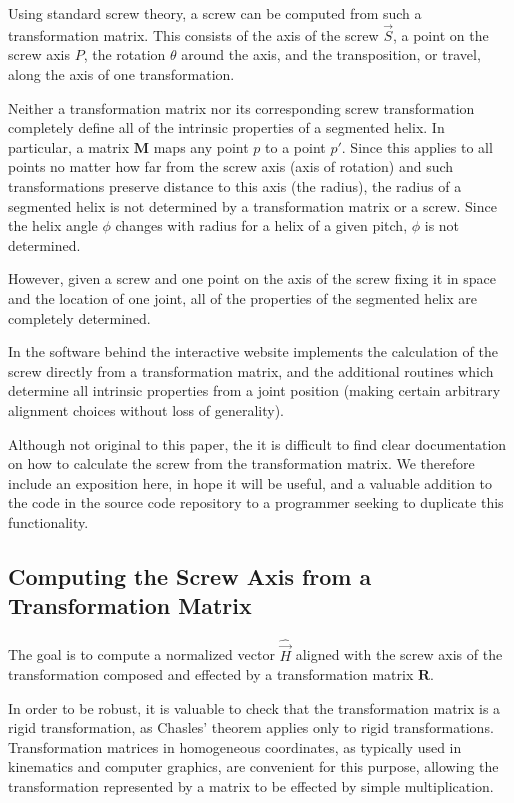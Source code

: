 \documentclass[11pt]{article}
\begin{document}
{Using standard screw theory\cite{wittenburg2016kinematics,wiki:screwaxis},
a screw can be computed from such
a transformation matrix. This consists of the axis of the screw $\overrightarrow{S}$,
a point on the screw axis $P$,
the rotation $\theta$ around the axis, and the
transposition, or travel, along the axis of one transformation.

Neither a transformation matrix nor its corresponding screw transformation
completely define all of the intrinsic
properties of a segmented helix. In particular, a matrix $\bm{M}$ maps any point $p$ to a point $p'$.
Since this applies to all points no matter how far from the screw axis (axis of rotation) and
such transformations preserve distance to this axis (the radius), the radius of a segmented helix
is not determined by a transformation matrix or a screw. Since the helix angle $\phi$ changes
with radius for a helix of a given pitch, $\phi$ is not determined.

However, given a screw and one point on the axis of the screw fixing it in space
and the location of one joint, all of the properties of the segmented helix are completely determined.

In the software behind the interactive website implements the calculation of the screw
directly from a transformation matrix, and
the additional routines which determine all intrinsic properties from a joint position (making
certain arbitrary alignment choices without loss of generality).

Although not original to this paper, the it is
difficult to find clear documentation on how to calculate the
screw from the transformation matrix.
We therefore include an exposition here, in hope it will be useful,
and a valuable addition to the code in the source code repository to a programmer seeking to duplicate
this functionality.

\subsection{Computing the Screw Axis from a Transformation Matrix}

The goal is to compute a normalized vector $\hat{\overrightarrow{H}}$ aligned with the screw
axis of the transformation composed and effected by a transformation matrix $\bm{R}$.

In order to be robust, it is valuable to check that the transformation
matrix is a rigid transformation\cite{wiki:rigid},
as Chasles' theorem applies only to rigid transformations.
Transformation matrices in homogeneous coordinates, as typically used in kinematics
and computer graphics, are convenient for this purpose, allowing the transformation
represented by a matrix to be effected by simple multiplication.

}
\end{document}
